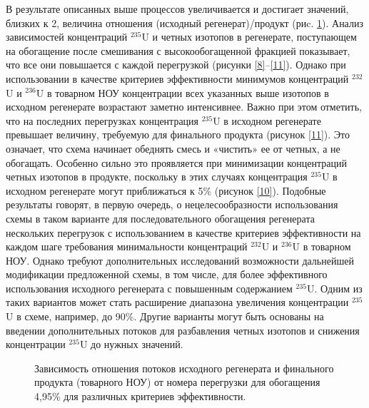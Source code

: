 В результате описанных выше процессов увеличивается и достигает значений, близких к 2, величина отношения (исходный регенерат)/продукт (риc. \ref{7}). Анализ зависимостей концентраций $^{235}$U и четных изотопов в регенерате, поступающем на обогащение после смешивания с высокообогащенной фракцией показывает, что все они повышается с каждой перегрузкой (рисунки \ref{8}–\ref{11}). Однако при использовании в качестве критериев эффективности минимумов концентраций  $^{232}$U и  $^{236}$U в товарном НОУ концентрации всех указанных выше изотопов в исходном регенерате возрастают заметно интенсивнее. Важно при этом отметить, что на последних перегрузках концентрация $^{235}$U в исходном регенерате превышает величину, требуемую для финального продукта (рисунок \ref{11}). Это означает, что схема начинает обеднять смесь и «чистить» ее от четных, а не обогащать. Особенно сильно это проявляется при минимизации концентраций четных изотопов в продукте, поскольку в этих случаях концентрация $^{235}$U в исходном регенерате могут приближаться к 5\% (рисунок \ref{10}). Подобные результаты говорят, в первую очередь, о нецелесообразности использования схемы в таком варианте для последовательного обогащения регенерата нескольких перегрузок с использованием в качестве критериев эффективности на каждом шаге требования минимальности концентраций $^{232}$U и  $^{236}$U в товарном НОУ. Однако требуют дополнительных исследований возможности дальнейшей модификации предложенной схемы, в том числе, для более эффективного использования исходного регенерата с повышенным содержанием $^{235}$U. Одним из таких вариантов может стать расширение диапазона увеличения концентрации  $^{235}$U в схеме, например, до 90\%. Другие варианты могут быть основаны на введении дополнительных потоков для разбавления четных изотопов и снижения концентрации  $^{235}$U до нужных значений.

\begin{figure}[ht]
    \caption{Зависимость отношения потоков исходного регенерата и финального продукта (товарного НОУ) от номера перегрузки для обогащения 4,95\% для различных критериев эффективности.}\label{7}
\end{figure}

